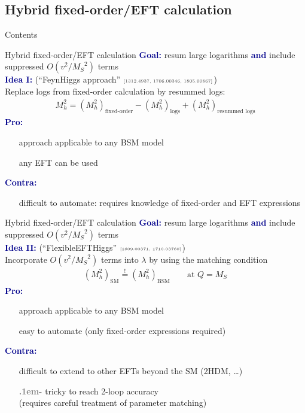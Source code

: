 \documentclass[hyperref={pdfpagelabels=false},ngerman]{beamer}
\newcommand{\cmark}{\ding{51}}%
\newcommand{\xmark}{\ding{55}}%
\newcommand{\ok}{\textcolor{darkgreen}{\cmark}}
\newcommand{\notok}{\textcolor{red}{\xmark}}
\newcommand{\meh}{\textcolor{gray}{\textbf{\huge\lower.1em\hbox{-}}}}
\newcommand{\MS}{\ensuremath{M_S}}
\newcommand{\mycite}[1]{\ensuremath{\text{\textcolor{darkgray}{\tiny [#1]}}}}
\renewcommand{\emph}[1]{\textbf{\textcolor{darkblue}{#1}}}
\newcommand{\SM}{\ensuremath{\text{SM}}}
\newcommand{\BSM}{\ensuremath{\text{BSM}}}
\begin{document}

\subsection{Hybrid fixed-order/EFT calculation}

\begin{frame}{Contents}
\end{frame}

\begin{frame}{Hybrid fixed-order/EFT calculation}
  \emph{Goal:} resum large logarithms \emph{and} include suppressed
  $O(v^2/\MS^2)$ terms
  \\[2em]
  \emph{Idea I:} (``FeynHiggs approach'' \mycite{1312.4937, 1706.00346, 1805.00867})\\
  Replace logs from fixed-order calculation by resummed logs:
  \begin{align*}
    M_h^2 = (M_h^2)_{\text{fixed-order}} - (M_h^2)_{\text{logs}} + (M_h^2)_{\text{resummed logs}}
  \end{align*}
  \emph{Pro:}
  \begin{itemize}
  \item[\ok] approach applicable to any BSM model
  \item[\ok] any EFT can be used
  \end{itemize}
  \emph{Contra:}
  \begin{itemize}
  \item[\notok] difficult to automate: requires knowledge of
    fixed-order and EFT expressions
  \end{itemize}
\end{frame}

\begin{frame}{Hybrid fixed-order/EFT calculation}
  \emph{Goal:} resum large logarithms \emph{and} include suppressed
  $O(v^2/\MS^2)$ terms
  \\[2em]
  \emph{Idea II:} (``FlexibleEFTHiggs'' \mycite{1609.00371,
    1710.03760})\\
  Incorporate $O(v^2/\MS^2)$ terms into $\lambda$ by using the
  matching condition
  \begin{align*}
    (M_h^2)_{\SM} \overset{!}{=} (M_h^2)_{\BSM} \qquad \text{at } Q = \MS
  \end{align*}
  \emph{Pro:}
  \begin{itemize}
  \item[\ok] approach applicable to any BSM model
  \item[\ok] easy to automate
    (only fixed-order expressions required)
  \end{itemize}
  \emph{Contra:}
  \begin{itemize}
  \item[\notok] difficult to extend to other EFTs beyond the SM (2HDM,
    \ldots)
  \item[\meh] tricky to reach 2-loop accuracy\\
    (requires careful treatment of parameter matching)
  \end{itemize}
\end{frame}
\end{document}
